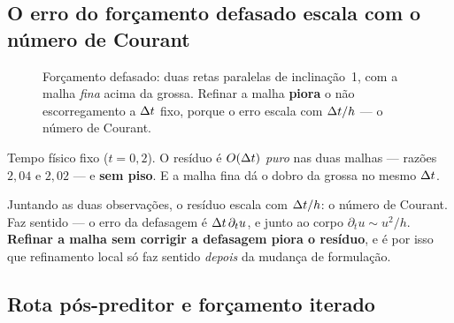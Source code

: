 \subsection{O erro do forçamento defasado escala com o número de Courant}


\begin{figure}[htbp]
\centering
{}
\caption{Forçamento defasado: duas retas paralelas de inclinação~1, com a malha
\emph{fina} acima da grossa. Refinar a malha \textbf{piora} o não
escorregamento a $\Delta t$ fixo, porque o erro escala com $\Delta t/h$ --- o número de
Courant.}
\label{fig:residuo-refino}
\end{figure}

\medskip
Tempo físico fixo ($t = 0{,}2$). O resíduo é $O(\Delta t)$ \emph{puro} nas duas
malhas --- razões $2{,}04$ e $2{,}02$ --- e \textbf{sem piso}. E a malha fina dá
o dobro da grossa no mesmo $\Delta t$.

Juntando as duas observações, o resíduo escala com $\Delta t/h$: o número de Courant.
Faz sentido --- o erro da defasagem é $\Delta t\,\partial_t u$, e junto ao corpo
$\partial_t u \sim u^2/h$. \textbf{Refinar a malha sem corrigir a defasagem
piora o resíduo}, e é por isso que refinamento local só faz sentido \emph{depois}
da mudança de formulação.

\subsection{Rota pós-preditor e forçamento iterado}

